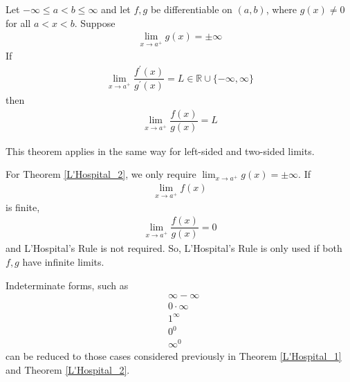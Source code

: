 \begin{theorem}
Let $-\infty \leq a < b \leq \infty$ and let $f, g$ be differentiable on $(a, b)$, where $g(x) \neq 0$ for all $a < x < b$. Suppose
\begin{align*}
    \lim_{x \longrightarrow a^{+}} g(x) = \pm \infty 
\end{align*}
If
\begin{align*}
    \lim_{x \longrightarrow a^{+}} \dfrac{f^{'}(x)}{g^{'}(x)} = L \in \mathbb{R} \cup \{-\infty, \infty\}
\end{align*}
then
\begin{align*}
    \lim_{x \longrightarrow a^{+}} \dfrac{f(x)}{g(x)} = L
\end{align*}
\label{L'Hospital_2}
\end{theorem}

\begin{note}
This theorem applies in the same way for left-sided and two-sided limits.
\end{note}

\begin{note}
For Theorem \ref{L'Hospital_2}, we only require $\lim_{x \longrightarrow a^{+}} g(x) = \pm \infty$. If 
\begin{align*}
    \lim_{x \longrightarrow a^{+}} f(x)
\end{align*} 
is finite,
\begin{align*}
    \lim_{x \longrightarrow a^{+}} \dfrac{f(x)}{g(x)} = 0
\end{align*}
and L'Hospital's Rule is not required. So, L'Hospital's Rule is only used if both $f, g$ have infinite limits.
\end{note}

\begin{note}
Indeterminate forms, such as
\begin{align*}
    &\infty - \infty\\
    &0 \cdot \infty\\
    &1^{\infty}\\
    &0^{0}\\
    &\infty^{0}
\end{align*}
can be reduced to those cases considered previously in Theorem \ref{L'Hospital_1} and Theorem \ref{L'Hospital_2}.
\end{note}